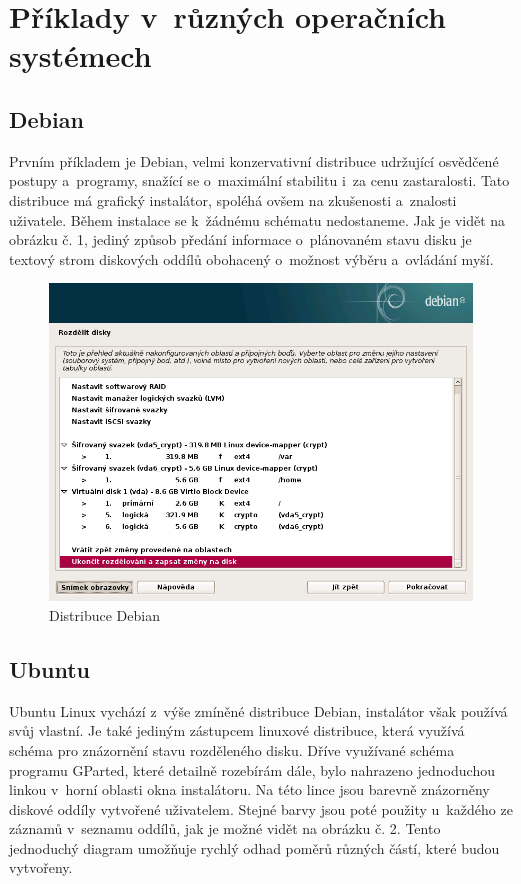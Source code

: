 \documentclass[color,table,oneside,nolot,nolof]{fithesis}
\begin{document}
\section{Příklady v~různých operačních systémech}

\subsection{Debian}

Prvním příkladem je Debian, velmi konzervativní distribuce udržující osvědčené postupy a~programy, snažící se o~maximální stabilitu i~za cenu zastaralosti. 
Tato distribuce má grafický instalátor, spoléhá ovšem na zkušenosti a~znalosti uživatele. Během instalace se k~žádnému schématu nedostaneme. Jak je vidět na obrázku č. 1, jediný způsob předání 
informace o~plánovaném stavu disku je textový strom diskových oddílů obohacený o~možnost výběru a~ovládání myší.

\begin{figure}[hb]
	\caption{Distribuce Debian}
	\centering
	\includegraphics[width=.6\columnwidth]{pictures/debian1.png}
\end{figure}

\subsection{Ubuntu}

Ubuntu Linux vychází z~výše zmíněné distribuce Debian, instalátor však používá svůj vlastní. Je také jediným zástupcem linuxové distribuce, která využívá  schéma 
pro znázornění stavu rozděleného disku. Dříve využívané schéma programu GParted, které detailně rozebírám dále, bylo nahrazeno jednoduchou linkou v~horní oblasti okna instalátoru. Na této lince 
jsou barevně znázorněny diskové 
oddíly vytvořené uživatelem. Stejné barvy jsou poté použity u~každého ze záznamů v~seznamu oddílů, jak je možné vidět na obrázku č. 2. Tento jednoduchý diagram umožňuje rychlý odhad poměrů různých 
částí, které budou vytvořeny.
\end{document}
